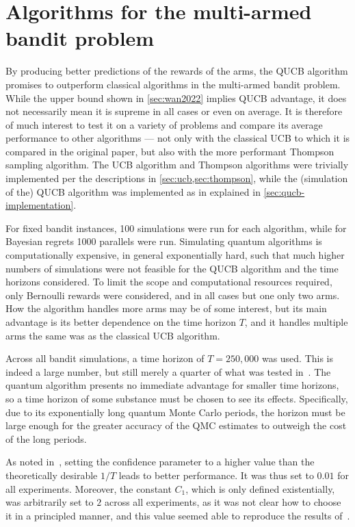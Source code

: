 \section{Algorithms for the multi-armed bandit problem}
By producing better predictions of the rewards of the arms, the QUCB algorithm promises to outperform classical algorithms in the multi-armed bandit problem.
While the upper bound shown in \cref{sec:wan2022} implies QUCB advantage, it does not necessarily mean it is supreme in all cases or even on average.
It is therefore of much interest to test it on a variety of problems and compare its average performance to other algorithms — not only with the classical UCB to which it is compared in the original paper, but also with the more performant Thompson sampling algorithm.
The UCB algorithm and Thompson algorithms were trivially implemented per the descriptions in \cref{sec:ucb,sec:thompson}, while the (simulation of the) QUCB algorithm was implemented as in explained in \cref{sec:qucb-implementation}.

For fixed bandit instances, 100 simulations were run for each algorithm, while for Bayesian regrets 1000 parallels were run.
Simulating quantum algorithms is computationally expensive, in general exponentially hard, such that much higher numbers of simulations were not feasible for the QUCB algorithm and the time horizons considered.
To limit the scope and computational resources required, only Bernoulli rewards were considered, and in all cases but one only two arms.
How the algorithm handles more arms may be of some interest, but its main advantage is its better dependence on the time horizon $T$, and it handles multiple arms the same was as the classical UCB algorithm.

Across all bandit simulations, a time horizon of $T=250,000$ was used.
This is indeed a large number, but still merely a quarter of what was tested in~\autocite{wan2022}.
The quantum algorithm presents no immediate advantage for smaller time horizons, so  a time horizon of some substance must be chosen to see its effects.
Specifically, due to its exponentially long quantum Monte Carlo periods, the horizon must be large enough for the greater accuracy of the QMC estimates to outweigh the cost of the long periods.

As noted in~\autocite{wan2022}, setting the confidence parameter to a higher value than the theoretically desirable $1/T$ leads to better performance.
It was thus set to $0.01$ for all experiments.
Moreover, the constant $C_1$, which is only defined existentially, was arbitrarily set to $2$ across all experiments, as it was not clear how to choose it in a principled manner, and this value seemed able to reproduce the results of~\autocite{wan2022}.

